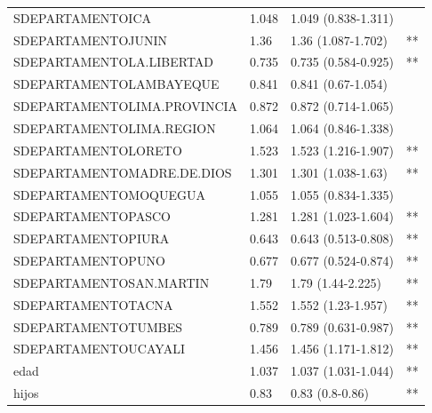 \begin{tabular}{llll}
  SDEPARTAMENTOICA & 1.048 & 1.049 (0.838-1.311) &  \\ 
  SDEPARTAMENTOJUNIN & 1.36 & 1.36 (1.087-1.702) & ** \\ 
  SDEPARTAMENTOLA.LIBERTAD & 0.735 & 0.735 (0.584-0.925) & ** \\ 
  SDEPARTAMENTOLAMBAYEQUE & 0.841 & 0.841 (0.67-1.054) &  \\ 
  SDEPARTAMENTOLIMA.PROVINCIA & 0.872 & 0.872 (0.714-1.065) &  \\ 
  SDEPARTAMENTOLIMA.REGION & 1.064 & 1.064 (0.846-1.338) &  \\ 
  SDEPARTAMENTOLORETO & 1.523 & 1.523 (1.216-1.907) & ** \\ 
  SDEPARTAMENTOMADRE.DE.DIOS & 1.301 & 1.301 (1.038-1.63) & ** \\ 
  SDEPARTAMENTOMOQUEGUA & 1.055 & 1.055 (0.834-1.335) &  \\ 
  SDEPARTAMENTOPASCO & 1.281 & 1.281 (1.023-1.604) & ** \\ 
  SDEPARTAMENTOPIURA & 0.643 & 0.643 (0.513-0.808) & ** \\ 
  SDEPARTAMENTOPUNO & 0.677 & 0.677 (0.524-0.874) & ** \\ 
  SDEPARTAMENTOSAN.MARTIN & 1.79 & 1.79 (1.44-2.225) & ** \\ 
  SDEPARTAMENTOTACNA & 1.552 & 1.552 (1.23-1.957) & ** \\ 
  SDEPARTAMENTOTUMBES & 0.789 & 0.789 (0.631-0.987) & ** \\ 
  SDEPARTAMENTOUCAYALI & 1.456 & 1.456 (1.171-1.812) & ** \\ 
  edad & 1.037 & 1.037 (1.031-1.044) & ** \\ 
  hijos & 0.83 & 0.83 (0.8-0.86) & ** \\ 
   \bottomrule
\end{tabular}
